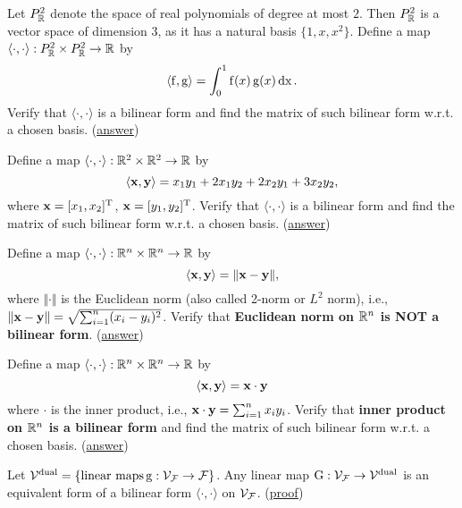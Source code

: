\begin{example}\label{example:bf1}
Let $P^2_{\mathbb{R}}$ denote the space of real polynomials of degree at most $2$. 
Then $P^2_{\mathbb{R}}$ is a vector space of dimension $3$, as it has a natural basis $\{1, x, x^2 \}$.
Define a map $\langle \cdot, \cdot \rangle: P^2_{\mathbb{R}} \times P^2_{\mathbb{R}} \to \mathbb{R}$ by
$$\langle \operatorname{f}, \operatorname{g} \rangle = \int_{0}^1 \operatorname{f}(x) \operatorname{g}(x) \operatorname{d\textnormal{x}}.$$
Verify that $\langle \cdot, \cdot \rangle$ is a bilinear form and find the matrix of such bilinear form w.r.t. a chosen basis.
(\hyperref[answer:bf1]{answer})
%
\end{example}  

\begin{example}\label{example:bf2}
%
Define a map $\langle \cdot, \cdot \rangle: \mathbb{R}^2 \times \mathbb{R}^2 \to \mathbb{R}$ by 
%
$$\langle \mathbf{x}, \mathbf{y} \rangle = x_1y_1 + 2x_1y_2 + 2x_2y_1 + 3x_2y_2,$$ 
%
where $\mathbf{x} = [x_1, x_2]^{\mathrm{T}}$, $\mathbf{x} = [y_1, y_2]^{\mathrm{T}}$.
Verify that $\langle \cdot, \cdot \rangle$ is a bilinear form and find the matrix of such bilinear form w.r.t. a chosen basis.  (\hyperref[answer:bf2]{answer})


%
\end{example}

\begin{example}\label{example:bf3}
Define a map $\langle \cdot, \cdot \rangle: \mathbb{R}^n \times \mathbb{R}^n \to \mathbb{R}$ by $$\langle \mathbf{x}, \mathbf{y} \rangle = \Vert \mathbf{x}-\mathbf{y} \Vert,$$ where $\Vert \cdot \Vert$ is the Euclidean norm (also called 2-norm or $L^2$ norm), i.e., $\Vert \mathbf{x}-\mathbf{y} \Vert = \sqrt{\sum_{i=1}^n (x_i - y_i)^2}$.
Verify that \textbf{Euclidean norm on $\mathbb{R}^n$ is NOT a bilinear form}. (\hyperref[answer:bf3]{answer})
%
\end{example}

\begin{example}\label{example:bf4}
%
Define a map $\langle \cdot, \cdot \rangle: \mathbb{R}^n \times \mathbb{R}^n \to \mathbb{R}$ by 
$$\langle \mathbf{x}, \mathbf{y} \rangle = \mathbf{x} \cdot \mathbf{y}$$ 
where $\cdot$ is the inner product, i.e., $\mathbf{x} \cdot \mathbf{y} = \sum_{i=1}^n x_iy_i$.
Verify that \textbf{inner product on $\mathbb{R}^n$ is a bilinear form} and find the matrix of such bilinear form w.r.t. a chosen basis.  (\hyperref[answer:bf4]{answer})
%
\end{example}


\begin{theorem}\label{thm:bilinear-def-2}
Let $\mathcal{V}^\textnormal{dual} = \{ \textnormal{linear maps} \operatorname{g}: \mathcal{V}_{\mathcal{F}} \to {\mathcal{F}} \}$.
Any linear map $\operatorname{G}: \mathcal{V}_{\mathcal{F}} \to \mathcal{V}^\textnormal{dual}$ is an equivalent form of a bilinear form $\langle \cdot, \cdot \rangle$ on $\mathcal{V}_{\mathcal{F}}$. (\hyperref[proof:bilinear-def-2]{proof})
\end{theorem}



